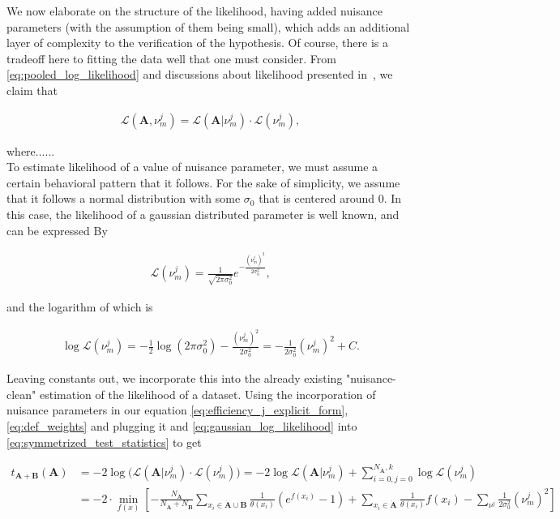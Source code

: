 \documentclass{article}
\newcommand{\dataset}[1]{{\mathbf{#1}}}         %
\newcommand{\reco}[1]{{\dataset{\dot{#1}}}}     %
\newcommand{\likelihood}{\mathcal{L}}           %
\newcommand{\llikelihood}{\log\mathcal{L}}      %
\begin{document}
We now elaborate on the structure of the likelihood, having added nuisance parameters (with the assumption of them being small), which adds an additional layer of complexity to the verification of the hypothesis. Of course, there is a tradeoff here to fitting the data well that one must consider. From \ref{eq:pooled_log_likelihood} and discussions about likelihood presented in~\cite{Italian_no_2_Learning_New_Physics_from_an_Imperfect_Machine}, we claim that %

$$
\begin{aligned}
    \likelihood(\dataset{A}, \nu^j_m) = \likelihood(\dataset{A}| \nu^j_m) \cdot \likelihood(\nu^j_m), 
\end{aligned}
$$

where......\\

To estimate likelihood of a value of nuisance parameter, we must assume a certain behavioral pattern that it follows. For the sake of simplicity, we assume that it follows a normal distribution with some $\sigma_0$ that is centered around $0$. In this case, the likelihood of a gaussian distributed parameter is well known, and can be expressed By

$$
\begin{aligned} \label{eq:gaussian_likelihood}
    \likelihood(\nu^j_m) = \frac{1}{\sqrt{2 \pi \sigma_0^2}} e^{-\frac{(\nu^j_m)^2}{2 \sigma_0^2}},
\end{aligned}
$$

\noindent and the logarithm of which is

$$
\begin{aligned} \label{eq:gaussian_log_likelihood}
    \llikelihood(\nu^j_m) = -\frac{1}{2} \log(2 \pi \sigma_0^2) - \frac{(\nu^j_m)^2}{2 \sigma_0^2} = - \frac{1}{2 \sigma_0^2} (\nu^j_m)^2 + C. 
\end{aligned}
$$

\noindent Leaving constants out, we incorporate this into the already existing "nuisance-clean" estimation of the likelihood of a dataset. Using the incorporation of nuisance parameters in our equation \ref{eq:efficiency_j_explicit_form}, \ref{eq:def_weights} and plugging it and \ref{eq:gaussian_log_likelihood} into \ref{eq:symmetrized_test_statistics} to get

$$
\begin{aligned} \label{eq:def_test_statistic_with_nuisance}
t_{\dataset{A}+\dataset{B}}(\dataset{A}) &= -2 \log \big( \likelihood(\dataset{A}| \nu^j_m) \cdot \likelihood(\nu^j_m) \big) = -2 \log \likelihood(\dataset{A}|\nu^j_m) + \sum_{i=0,j=0}^{N_\reco{A}, k} \log \likelihood(\nu^j_m) \\
 &= -2 \cdot \min_{f(x)}
\left[
    - \frac{N_{\reco{A}}}{N_{\reco{A}} + N_{\reco{B}}}
    \sum_{x_i \in \reco{A} \cup \reco{B}} \frac{1}{\theta(x_i)} (e^{f(x_i)} - 1)
    + \sum_{x_i \in \reco{A}} \frac{1}{\theta(x_i)} f(x_i)
    - \sum_{\nu^j} \frac{1}{2 \sigma_0^2} (\nu^j_m)^2
\right]
\end{aligned}
$$
\end{document}
